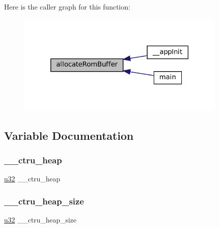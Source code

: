 Here is the caller graph for this function\+:
\nopagebreak
\begin{figure}[H]
\begin{center}
\leavevmode
\includegraphics[width=285pt]{ctru-heap_8c_a0bd24a0db1208055a4b6ab4f7c2c3aa8_icgraph}
\end{center}
\end{figure}


\subsection{Variable Documentation}
\mbox{\label{ctru-heap_8c_aeefa57d10efe46c71a4c1588782af65d}} 
\subsubsection{\texorpdfstring{\+\_\+\+\_\+ctru\+\_\+heap}{\_\_ctru\_heap}}
{\footnotesize\ttfamily \mbox{\hyperlink{sqlite3_8c_a03ad5adfaeb9b7640dde78a0cc390319}{u32}} \+\_\+\+\_\+ctru\+\_\+heap}

\mbox{\label{ctru-heap_8c_a52a56c958076252d270d51320c8ca1b3}} 
\subsubsection{\texorpdfstring{\+\_\+\+\_\+ctru\+\_\+heap\+\_\+size}{\_\_ctru\_heap\_size}}
{\footnotesize\ttfamily \mbox{\hyperlink{sqlite3_8c_a03ad5adfaeb9b7640dde78a0cc390319}{u32}} \+\_\+\+\_\+ctru\+\_\+heap\+\_\+size}

